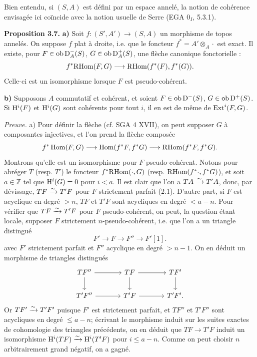 \documentclass[11pt]{article}
\begin{document}
Bien entendu, si \((S,A)\) est défini par un espace annelé, la notion de cohérence envisagée ici coïncide avec la notion usuelle de Serre (EGA \(0_I\), 5.3.1).

\textbf{Proposition 3.7.} \textbf{a)} Soit \(f:(S',A')\to(S,A)\) un morphisme de topos annelés. On suppose \(f\) plat à droite, i.e. que le foncteur \(f^*=A'\otimes_A\cdot\) est exact. Il existe, pour \(F\in\operatorname{ob}\mathrm D_A^-(S)\), \(G\in\operatorname{ob}\mathrm D_A^+(S)\), une flèche canonique fonctorielle :
\[
  f^*\mathrm R\!\operatorname{Hom}(F,G)\longrightarrow\mathrm R\!\operatorname{Hom}(f^*(F),f^*(G)).
\]
Celle-ci est un isomorphisme lorsque \(F\) est pseudo-cohérent.

\textbf{b)} Supposons \(A\) commutatif et cohérent, et soient \(F\in\operatorname{ob}\mathrm D^-(S)\), \(G\in\operatorname{ob}\mathrm D^+(S)\). Si \(\mathrm H^i(F)\) et \(\mathrm H^i(G)\) sont cohérents pour tout \(i\), il en est de même de \(\operatorname{Ext}^i(F,G)\).

\emph{Preuve.} a) Pour définir la flèche (cf. SGA 4 XVII), on peut supposer \(G\) à composantes injectives, et l'on prend la flèche composée
\[
  f^*\operatorname{Hom}(F,G)\longrightarrow\operatorname{Hom}(f^*F,f^*G)\longrightarrow\mathrm R\!\operatorname{Hom}(f^*F,f^*G).
\]
Montrons qu'elle est un isomorphisme pour \(F\) pseudo-cohérent. Notons pour abréger \(T\) (resp. \(T'\)) le foncteur \(f^*\mathrm R\!\operatorname{Hom}(\cdot,G)\) (resp. \(\mathrm R\!\operatorname{Hom}(f^*\cdot,f^*G)\)), et soit \(a\in\mathbb Z\) tel que \(\mathrm H^i(G)=0\) pour \(i<a\). Il est clair que l'on a \(TA\xrightarrow{\sim} T'A\), donc, par dévissage, \(TF\xrightarrow{\sim} T'F\) pour \(F\) strictement parfait (2.1). D'autre part, si \(F\) est acyclique en degré \(>n\), \(TF\) et \(T'F\) sont acycliques en degré \(<a-n\). Pour vérifier que \(TF\xrightarrow{\sim} T'F\) pour \(F\) pseudo-cohérent, on peut, la question étant locale, supposer \(F\) strictement \(n\)-pseudo-cohérent, i.e. que l'on a un triangle distingué
\[
  F'\longrightarrow F\longrightarrow F''\longrightarrow F'[1].
\]
avec \(F'\) strictement parfait et \(F''\) acyclique en degré \(>n-1\). On en déduit un morphisme de triangles distingués
\[
\begin{tikzcd}[column sep=large]
TF'' \arrow[r]\arrow[d]&TF\arrow[r]\arrow[d]&TF'\arrow[d]\\
T'F''\arrow[r]&T'F\arrow[r]&T'F' .
\end{tikzcd}
\]
Or \(TF'\xrightarrow{\sim} T'F'\) puisque \(F'\) est strictement parfait, et \(TF''\) et \(T'F''\) sont acycliques en degré \(\leq a-n\); écrivant le morphisme induit sur les suites exactes de cohomologie des triangles précédents, on en déduit que \(TF\to T'F\) induit un isomorphisme \(\mathrm H^i(TF)\xrightarrow{\sim}\mathrm H^i(T'F)\) pour \(i\leq a-n\). Comme on peut choisir \(n\) arbitrairement grand négatif, on a gagné.
\end{document}
